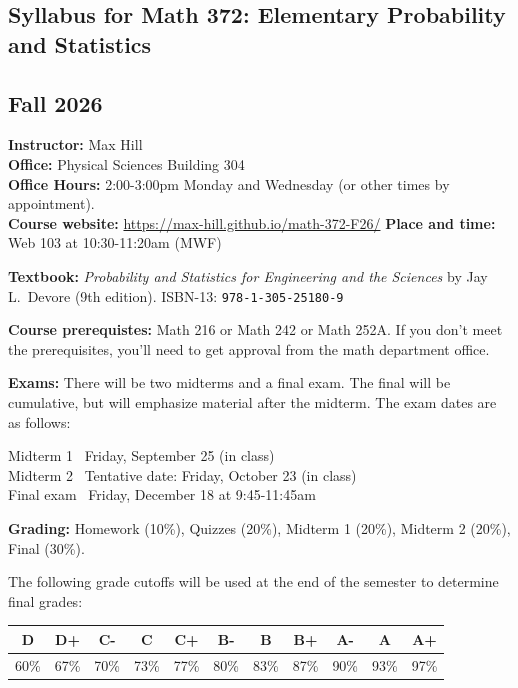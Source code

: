 \documentclass[10pt]{article}
\newcommand{\vt}{\vskip 5mm} %
\newcommand{\fl}{\\\noindent\textbf} %
\newcommand{\Fl}{\vt\noindent\textbf} %
\begin{document}
\begin{center}
  \section*{Syllabus for Math 372: Elementary Probability and Statistics}
  \subsection*{Fall 2026}
\end{center}

\Fl{Instructor:} Max Hill
\fl{Office:} Physical Sciences Building 304
\fl{Office Hours:} 2:00-3:00pm Monday and Wednesday (or other times by appointment).
\fl{Course website:} \url{https://max-hill.github.io/math-372-F26/}
\Fl{Place and time:} Web 103 at 10:30-11:20am (MWF)

\Fl{Textbook:} \textit{Probability and Statistics for Engineering and the Sciences} by Jay L.~Devore (9th
edition). ISBN-13: \texttt{978-1-305-25180-9}

\Fl{Course prerequistes:} Math 216 or Math 242 or Math 252A. If you don't meet the prerequisites, you'll
need to get approval from the math department office.

\Fl{Exams:} There will be two midterms and a final exam. The final will be cumulative, but will emphasize
material after the midterm.  The exam dates are as follows:
\vspace{1em}
\begin{center}
  \begin{minipage}{5.0in}
    \begin{flushleft}
      Midterm 1 \dotfill~Friday, September 25 (in class) \\
      Midterm 2 \dotfill~Tentative date: Friday, October 23 (in class)\\
      Final exam \dotfill~Friday, December 18 at 9:45-11:45am\\
    \end{flushleft}
  \end{minipage}
\end{center}

\Fl{Grading:} Homework (10\%), Quizzes (20\%), Midterm 1 (20\%), Midterm 2 (20\%), Final (30\%).

The following grade cutoffs will be used at the end of the semester to
determine final grades:
\begin{center}
  \begin{tabular}{|c|c|c|c|c|c|c|c|c|c|c|}
    \hline
    D&D+&C-&C&C+&B-&B&B+&A-&A&A+  \\
    \hline
    60\%&67\%&70\%&73\%&77\%&80\%&83\%&87\%&90\%&93\%&97\%\\
    \hline
  \end{tabular}
\end{center}
\end{document}
